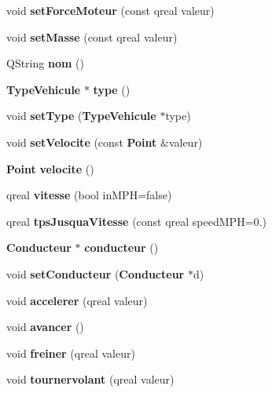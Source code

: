 \begin{DoxyCompactItemize}
\item 
void {\bfseries set\-Force\-Moteur} (const qreal valeur)\label{class_vehicule_a72d2d22eadf542fbdabce73352328010}

\item 
void {\bfseries set\-Masse} (const qreal valeur)\label{class_vehicule_a69f0463cca0089567b1161235e4e85ff}

\item 
\-Q\-String {\bfseries nom} ()\label{class_vehicule_af9226329f384b6968b031c3f1b143403}

\item 
{\bf \-Type\-Vehicule} $\ast$ {\bfseries type} ()\label{class_vehicule_a1342b8a4a89da5616bf9bb56780d5147}

\item 
void {\bfseries set\-Type} ({\bf \-Type\-Vehicule} $\ast$type)\label{class_vehicule_a307d338f156209233b2cb34a1bda7317}

\item 
void {\bfseries set\-Velocite} (const {\bf \-Point} \&valeur)\label{class_vehicule_aac6c268c42aab424ead7aef118641943}

\item 
{\bf \-Point} {\bfseries velocite} ()\label{class_vehicule_a60cc923c59c9eec2e0096f9c4ccb0d82}

\item 
qreal {\bfseries vitesse} (bool in\-M\-P\-H=false)\label{class_vehicule_acc821135dd281512840e1e9974a0b3fa}

\item 
qreal {\bfseries tps\-Jusqua\-Vitesse} (const qreal speed\-M\-P\-H=0.)\label{class_vehicule_afdd76337ce8dfa8149f0296614d2b52f}

\item 
{\bf \-Conducteur} $\ast$ {\bfseries conducteur} ()\label{class_vehicule_add552335ade385f1a8b524a86669070b}

\item 
void {\bfseries set\-Conducteur} ({\bf \-Conducteur} $\ast$d)\label{class_vehicule_a75c03ea37c82e8ff34a688d1817d3274}

\item 
void {\bf accelerer} (qreal valeur)
\item 
void {\bfseries avancer} ()\label{class_vehicule_a5a24b2c7dcb0b78849d68cdc4a0e6d96}

\item 
void {\bfseries freiner} (qreal valeur)\label{class_vehicule_a40715f472879f1213ebdc42821bd2e0e}

\item 
void {\bfseries tournervolant} (qreal valeur)\label{class_vehicule_a67a2540703ce398a9c6fbc9b69a7521a}

\end{DoxyCompactItemize}


